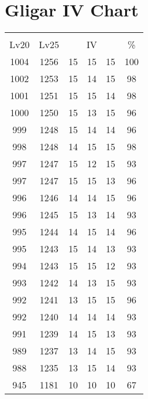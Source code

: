 \documentclass{article}%
\begin{document}
%
\normalsize%
\section{Gligar IV Chart}%
\label{sec:Gligar IV Chart}%
\renewcommand{\arraystretch}{1.5}%
\begin{tabular}{|c|c|c|c|c|c|}%
\hline%
\multicolumn{6}{|c|}{\textcolor{white}{ 
\linebreak{Gligar}
}%
\cellcolor{black}}\\%
\multicolumn{1}{|c}{Lv20}&\multicolumn{1}{c|}{Lv25}&\multicolumn{3}{c|}{IV}&\multicolumn{1}{|c|}{\%}\\%
\hline%
\rowcolor{color100}%
1004&1256&15&15&15&100\\%
\hline%
\rowcolor{color98}%
1002&1253&15&14&15&98\\%
\hline%
\rowcolor{color98}%
1001&1251&15&15&14&98\\%
\hline%
\rowcolor{color96}%
1000&1250&15&13&15&96\\%
\hline%
\rowcolor{color96}%
999&1248&15&14&14&96\\%
\hline%
\rowcolor{color98}%
998&1248&14&15&15&98\\%
\hline%
\rowcolor{color93}%
997&1247&15&12&15&93\\%
\hline%
\rowcolor{color96}%
997&1247&15&15&13&96\\%
\hline%
\rowcolor{color96}%
996&1246&14&14&15&96\\%
\hline%
\rowcolor{color93}%
996&1245&15&13&14&93\\%
\hline%
\rowcolor{color96}%
995&1244&14&15&14&96\\%
\hline%
\rowcolor{color93}%
995&1243&15&14&13&93\\%
\hline%
\rowcolor{color93}%
994&1243&15&15&12&93\\%
\hline%
\rowcolor{color93}%
993&1242&14&13&15&93\\%
\hline%
\rowcolor{color96}%
992&1241&13&15&15&96\\%
\hline%
\rowcolor{color93}%
992&1240&14&14&14&93\\%
\hline%
\rowcolor{color93}%
991&1239&14&15&13&93\\%
\hline%
\rowcolor{color93}%
989&1237&13&14&15&93\\%
\hline%
\rowcolor{color93}%
988&1235&13&15&14&93\\%
\hline%
\rowcolor{color91}%
945&1181&10&10&10&67\\%
\end{tabular}

%
\end{document}
